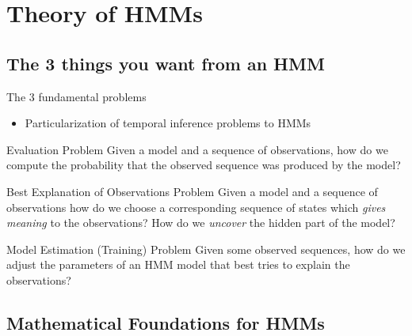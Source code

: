 \section{Theory of HMMs}
\label{sec:theory}

\subsection{The 3 things you want from an HMM}
\label{sec:problems}

\begin{frame}
  
  The 3 fundamental problems \parencite{rabiner1989tutorial}
  \begin{itemize}
  	\item Particularization of temporal inference problems to HMMs
  \end{itemize}
  \pause

  \begin{block}{Evaluation Problem}
    Given a model and a sequence of observations, how do we compute the probability that the \alert{observed 
    sequence} was produced by the model?
  \end{block}
  \pause
  \begin{block}{Best Explanation of Observations Problem}
    Given a model and a sequence of observations how do we choose a corresponding sequence of \alert{states} which 
    \emph{gives meaning} to the observations? How do we \emph{uncover} the hidden part of the model?
  \end{block}
  \pause
  \begin{block}{Model Estimation (Training) Problem}
    Given some observed sequences, how do we adjust the \alert{parameters} of an HMM model that best tries to explain 
    the observations? 
    
  \end{block}

\end{frame}


\subsection{Mathematical Foundations for HMMs}
\label{sec:math}

